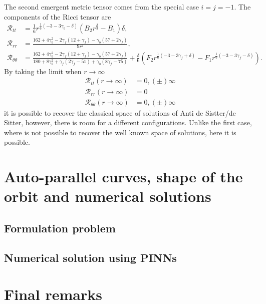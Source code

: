 \documentclass{article}
\begin{document}
The second emergent metric tensor comes from the special case $i = j = -1$. The components of 
the Ricci tensor are
\begin{align}
    \mathcal{R}_{tt} & = \frac{1}{6}r^{\frac{1}{6}\left(-3 - 3\gamma_b -\delta\right)}\left(B_2r^{\frac{\delta}{3}} - B_1\right)\delta, \\
    \mathcal{R}_{rr} & = \frac{162 + 4\gamma_b^2 - 2\gamma_f \left(12 + \gamma_f\right) - \gamma_b\left(57 + 2\gamma_f\right)}{9r^2}, \\
    \mathcal{R}_{\theta\theta} & = \frac{162 + 4\gamma_b^2 - 2\gamma_f \left(12 + \gamma_f\right) - \gamma_b\left(57 + 2\gamma_f\right)}{180 + 8\gamma_b^2 + \gamma_f \left(2\gamma_f - 51\right) + \gamma_b\left(8\gamma_f - 75\right)} 
    + \frac{\delta}{6} \left(F_2r^{\frac{1}{6}\left(-3 - 3\gamma_f + \delta\right)} - F_1r^{\frac{1}{6}\left(-3 - 3\gamma_f - \delta\right)}\right).
\end{align}
By taking the limit when $r \to \infty$
\begin{align}
    \mathcal{R}_{tt}(r \to \infty) & = 0, (\pm)\infty \\
    \mathcal{R}_{rr}(r \to \infty) & = 0 \\
    \mathcal{R}_{\theta\theta}(r \to \infty) & = 0,(\pm)\infty
\end{align}
it is possible to recover the classical space of solutions of Anti de Sistter/de Sitter, however, there
is room for a different configurations. Unlike the first case, where is not possible to recover the well known
space of solutions, here it is possible.

\section{Auto-parallel curves, shape of the orbit and numerical solutions}

\subsection{Formulation problem}

\subsection{Numerical solution using PINNs}

\section{Final remarks}
\label{sec:final_remarks}



\end{document}
